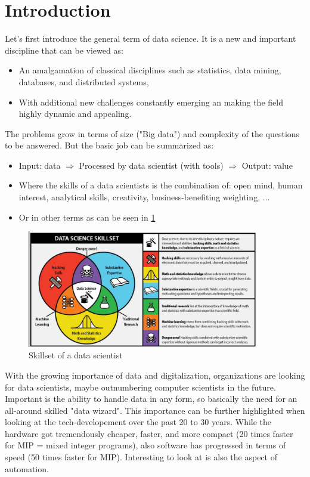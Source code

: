 \section*{Introduction}
\setcounter{figure}{0}

Let's first introduce the general term of data science. It is a new and important discipline that can be viewed as:
\begin{itemize}
  \item An amalgamation of classical disciplines such as statistics, data mining, databases, and distributed systems,
  \item With additional new challenges constantly emerging an making the field highly dynamic and appealing.
\end{itemize} 
The problems grow in terms of size ("Big data") and complexity of the questions to be answered. But the basic job can be summarized as:
\begin{itemize}
  \item Input: data $\Rightarrow$ Processed by data scientist (with tools) $\Rightarrow$ Output: value
  \item Where the skills of a data scientists is the combination of: open mind, human interest, analytical skills, creativity, business-benefiting weighting, $\dots$
  \item Or in other terms as can be seen in \ref{fig:0_skillset}
\end{itemize}

\begin{figure}[H]
  \centering
  \includegraphics[width=0.9\textwidth]{assets/intro/data_scientist_skillset.png} 
  \caption{Skillset of a data scientist}
  \label{fig:0_skillset}
\end{figure}

With the growing importance of data and digitalization, organizations are looking for data scientists, maybe outnumbering computer scientists in the future. Important is the ability to handle data in any form, so basically the need for an all-around skilled "data wizard". This importance can be further highlighted when looking at the tech-developement over the past 20 to 30 years. While the hardware got tremendously cheaper, faster, and more compact (20 times faster for MIP = mixed integer programs), also software has progressed in terms of speed (50 times faster for MIP). Interesting to look at is also the aspect of automation.

